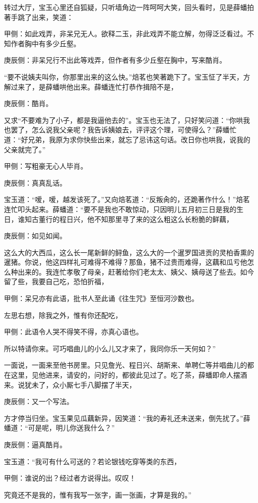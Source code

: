 \begin{parag}
    转过大厅，宝玉心里还自狐疑，只听墙角边一阵呵呵大笑，回头看时，见是薛蟠拍著手跳了出来，笑道：\begin{note}甲侧：如此戏弄，非呆兄无人。欲释二玉，非此戏弄不能立解，勿得泛泛看过。不知作者胸中有多少丘壑。\end{note}\begin{note}庚辰侧：非呆兄行不出此等戏弄，但作者有多少丘壑在胸中，写来酷肖。\end{note}“要不说姨夫叫你，你那里出来的这么快。”焙茗也笑著跪下了。宝玉怔了半天，方解过来了，是薛蟠哄他出来。薛蟠连忙打恭作揖陪不是，\begin{note}庚辰侧：酷肖。\end{note}又求“不要难为了小子，都是我逼他去的”。宝玉也无法了，只好笑问道：“你哄我也罢了，怎么说我父亲呢？我告诉姨娘去，评评这个理，可使得么？”薛蟠忙道：“好兄弟，我原为求你快些出来，就忘了忌讳这句话。改日你也哄我，说我的父亲就完了。”\begin{note}甲侧：写粗豪无心人毕肖。\end{note}\begin{note}庚辰侧：真真乱话。\end{note}宝玉道：“嗳，嗳，越发该死了。”又向焙茗道：“反叛肏的，还跪著作什么！”焙茗连忙叩头起来。薛蟠道：“要不是我也不敢惊动，只因明儿五月初三日是我的生日，谁知古董行的程日兴，他不知那里寻了来的这么粗这么长粉脆的鲜藕，\begin{note}庚辰侧：如见如闻。\end{note}这么大的大西瓜，这么长一尾新鲜的鲟鱼，这么大的一个暹罗国进贡的灵柏香熏的暹猪。你说，他这四样礼可难得不难得？那鱼，猪不过贵而难得，这藕和瓜亏他怎么种出来的。我连忙孝敬了母亲，赶著给你们老太太、姨父、姨母送了些去。如今留了些，我要自己吃，恐怕折福，\begin{note}甲侧：呆兄亦有此语，批书人至此诵《往生咒》至恒河沙数也。\end{note}左思右想，除我之外，惟有你还配吃，\begin{note}甲侧：此语令人哭不得笑不得，亦真心语也。\end{note}所以特请你来。可巧唱曲儿的小么儿又才来了，我同你乐一天何如？”
\end{parag}


\begin{parag}
    一面说，一面来至他书房里。只见詹光、程日兴、胡斯来、单聘仁等并唱曲儿的都在这里，见他进来，请安的，问好的，都彼此见过了。吃了茶，薛蟠即命人摆酒来。说犹未了，众小厮七手八脚摆了半天，\begin{note}庚辰侧：又一个写法。\end{note}方才停当归坐。宝玉果见瓜藕新异，因笑道：“我的寿礼还未送来，倒先扰了。”薛蟠道：“可是呢，明儿你送我什么？”\begin{note}庚辰侧：逼真酷肖。\end{note}宝玉道：“我可有什么可送的？若论银钱吃穿等类的东西，\begin{note}甲侧：谁说的出？经过者方说得出。叹叹！\end{note}究竟还不是我的，惟有我写一张字，画一张画，才算是我的。”
\end{parag}


